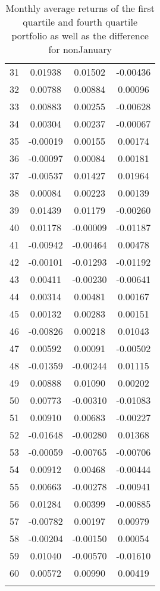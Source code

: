 \documentclass[11pt]{article}
\begin{document}
\begin{longtable}{cccc}
  31 & 0.01938 & 0.01502 & -0.00436 \\ 
  32 & 0.00788 & 0.00884 & 0.00096 \\ 
  33 & 0.00883 & 0.00255 & -0.00628 \\ 
  34 & 0.00304 & 0.00237 & -0.00067 \\ 
  35 & -0.00019 & 0.00155 & 0.00174 \\ 
  36 & -0.00097 & 0.00084 & 0.00181 \\ 
  37 & -0.00537 & 0.01427 & 0.01964 \\ 
  38 & 0.00084 & 0.00223 & 0.00139 \\ 
  39 & 0.01439 & 0.01179 & -0.00260 \\ 
  40 & 0.01178 & -0.00009 & -0.01187 \\ 
  41 & -0.00942 & -0.00464 & 0.00478 \\ 
  42 & -0.00101 & -0.01293 & -0.01192 \\ 
  43 & 0.00411 & -0.00230 & -0.00641 \\ 
  44 & 0.00314 & 0.00481 & 0.00167 \\ 
  45 & 0.00132 & 0.00283 & 0.00151 \\ 
  46 & -0.00826 & 0.00218 & 0.01043 \\ 
  47 & 0.00592 & 0.00091 & -0.00502 \\ 
  48 & -0.01359 & -0.00244 & 0.01115 \\ 
  49 & 0.00888 & 0.01090 & 0.00202 \\ 
  50 & 0.00773 & -0.00310 & -0.01083 \\ 
  51 & 0.00910 & 0.00683 & -0.00227 \\ 
  52 & -0.01648 & -0.00280 & 0.01368 \\ 
  53 & -0.00059 & -0.00765 & -0.00706 \\ 
  54 & 0.00912 & 0.00468 & -0.00444 \\ 
  55 & 0.00663 & -0.00278 & -0.00941 \\ 
  56 & 0.01284 & 0.00399 & -0.00885 \\ 
  57 & -0.00782 & 0.00197 & 0.00979 \\ 
  58 & -0.00204 & -0.00150 & 0.00054 \\ 
  59 & 0.01040 & -0.00570 & -0.01610 \\ 
  60 & 0.00572 & 0.00990 & 0.00419 \\ 
   \hline
\caption{Monthly average returns of the first quartile and fourth quartile portfolio as well as the difference for nonJanuary}\label{tableq1.2nonj}
\end{longtable}
\end{document}
